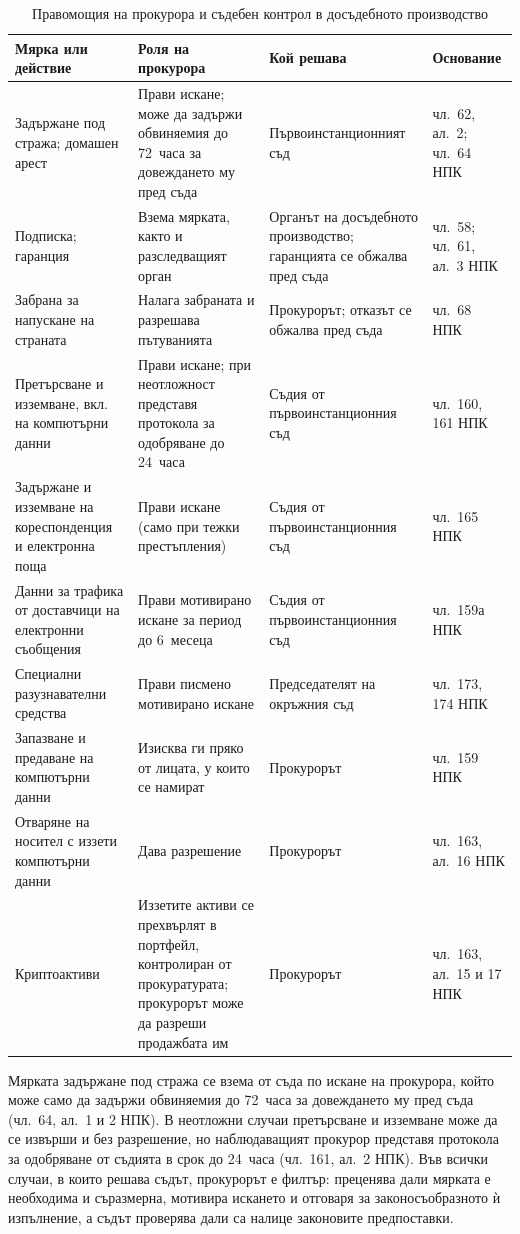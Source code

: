 \begin{table}[t]
\centering
\caption{Правомощия на прокурора и съдебен контрол в досъдебното производство}
\label{tab:kontrol}
\small
\begin{tabularx}{\textwidth}{@{}L{3.9cm}YL{3.4cm}L{2.5cm}@{}}
\toprule
\textbf{Мярка или действие} & \textbf{Роля на прокурора} & \textbf{Кой решава} & \textbf{Основание}\\
\midrule
Задържане под стража; домашен арест & Прави искане; може да задържи обвиняемия до 72~часа за довеждането му пред съда & Първоинстанционният съд & чл.~62, ал.~2; чл.~64 НПК\\
Подписка; гаранция & Взема мярката, както и разследващият орган & Органът на досъдебното производство; гаранцията се обжалва пред съда & чл.~58; чл.~61, ал.~3 НПК\\
Забрана за напускане на страната & Налага забраната и разрешава пътуванията & Прокурорът; отказът се обжалва пред съда & чл.~68 НПК\\
Претърсване и изземване, вкл. на компютърни данни & Прави искане; при неотложност представя протокола за одобряване до 24~часа & Съдия от първоинстанционния съд & чл.~160, 161 НПК\\
Задържане и изземване на кореспонденция и електронна поща & Прави искане (само при тежки престъпления) & Съдия от първоинстанционния съд & чл.~165 НПК\\
Данни за трафика от доставчици на електронни съобщения & Прави мотивирано искане за период до 6~месеца & Съдия от първоинстанционния съд & чл.~159а НПК\\
Специални разузнавателни средства & Прави писмено мотивирано искане & Председателят на окръжния съд & чл.~173, 174 НПК\\
Запазване и предаване на компютърни данни & Изисква ги пряко от лицата, у които се намират & Прокурорът & чл.~159 НПК\\
Отваряне на носител с иззети компютърни данни & Дава разрешение & Прокурорът & чл.~163, ал.~16 НПК\\
Криптоактиви & Иззетите активи се прехвърлят в портфейл, контролиран от прокуратурата; прокурорът може да разреши продажбата им & Прокурорът & чл.~163, ал.~15 и 17 НПК\\
\bottomrule
\end{tabularx}
\end{table}

Мярката задържане под стража се взема от съда по искане на прокурора, който може само
да задържи обвиняемия до 72~часа за довеждането му пред съда (чл.~64, ал.~1 и 2 НПК). В
неотложни случаи претърсване и изземване може да се извърши и без разрешение, но
наблюдаващият прокурор представя протокола за одобряване от съдията в срок до 24~часа
(чл.~161, ал.~2 НПК). Във всички случаи, в които решава съдът, прокурорът е филтър:
преценява дали мярката е необходима и съразмерна, мотивира искането и отговаря
за законосъобразното ѝ изпълнение, а съдът проверява дали са налице законовите предпоставки.

